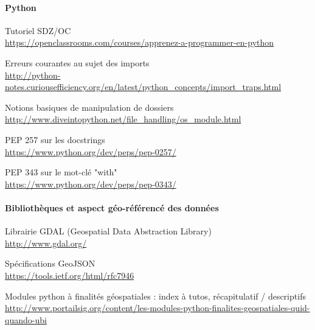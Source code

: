 {\begin{description}
\end{description}





\paragraph{Python}
\begin{description}

  \item Tutoriel SDZ/OC \\
  \url{https://openclassrooms.com/courses/apprenez-a-programmer-en-python}

  \item Erreurs courantes au sujet des imports \\
  \url{http://python-notes.curiousefficiency.org/en/latest/python_concepts/import_traps.html}

  \item Notions basiques de manipulation de dossiers \\
  \url{http://www.diveintopython.net/file_handling/os_module.html}

  \item PEP 257 sur les docstrings \\
  \url{https://www.python.org/dev/peps/pep-0257/}

  \item PEP 343 sur le mot-clé "with" \\
  \url{https://www.python.org/dev/peps/pep-0343/}

\end{description}





\paragraph{Bibliothèques et aspect géo-référencé des données}
\begin{description}

    \item Librairie GDAL (Geospatial Data Abstraction Library) \\
    \url{http://www.gdal.org/}

    \item Spécifications GeoJSON \\
    \url{https://tools.ietf.org/html/rfc7946}

    \item Modules python à finalités géospatiales : index à tutos, récapitulatif / descriptifs \\
    \url{http://www.portailsig.org/content/les-modules-python-finalites-geospatiales-quid-quando-ubi}


\end{description}}

